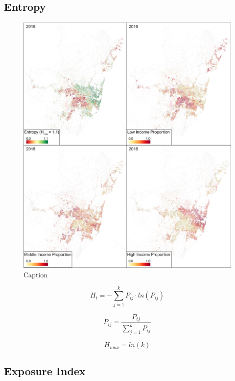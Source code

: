 \subsection{Entropy}

\begin{figure}[p]
    \centering
    \includegraphics[width=1\textwidth]{body/figures/Income_Proportion_16.png}
    \caption{Caption}
    \label{fig:my_label}
\end{figure}

\begin{equation}
    H_{i} = - \sum^{k}_{j=1}P_{ij} \cdot ln(P_{ij})
\end{equation}

\begin{equation}
    P_{ij} = \frac{P_{ij}}{\sum_{j=1}^{k}P_{ij}}
\end{equation}

\begin{equation}
    H_{max} = ln(k)
\end{equation}

\subsection{Exposure Index}

